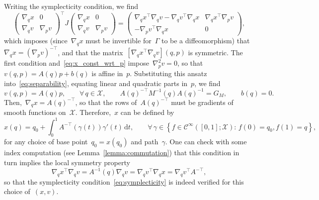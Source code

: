 \documentclass[10pt]{article}
\renewcommand{\d}{\mathrm{d}}
\newcommand{\cX}{\mathcal{X}}
\newcommand{\1}{\mathbbm 1}
\begin{document}
Writing the symplecticity condition, we find
\begin{equation}
    \begin{pmatrix}
        \nabla_q x & 0 \\ \nabla_q v & \nabla_p v
    \end{pmatrix}^\top J \begin{pmatrix}
        \nabla_q x & 0 \\ \nabla_q v & \nabla_p v
    \end{pmatrix} = \begin{pmatrix}
    \nabla_q x^\top\nabla_q v -\nabla_q v^\top \nabla_q x & \nabla_q x^\top \nabla_p v \\ -\nabla_p v^\top\nabla_q x & 0
    \end{pmatrix},
\end{equation}
which imposes (since~$\nabla_q x$ must be invertible for~$\Gamma$ to be a diffeomorphism) that~${\nabla_q x = \left(\nabla_p v\right)^{-\top}}$, and that the matrix~$\left[\nabla_q x^\top \nabla_q v\right](q,p)$ is symmetric.
The first condition and~\eqref{eq:x_const_wrt_p} impose~${\nabla^2_p v=0}$, so that~${v(q,p)=A(q) p+b(q)}$ is affine in~$p$. Substituting this ansatz into~\eqref{eq:separability}, equating linear and quadratic parts in~$p$, we find
\begin{equation}
    \label{eq:factorization}
   v(q,p)=A(q)p,\qquad\forall\,q\in \cX,\qquad A(q)^{-\top} M^{-1}(q)A(q)^{-1} = G_M,\qquad b(q)=0.
\end{equation}
Then,~$\nabla_q x = A(q)^{-\top}$, so that the rows of~$A(q)^{-\top}$ must be gradients of smooth functions on~$\cX$. Therefore,~$x$ can be defined by
\begin{equation}
    \label{eq:q_definition}
    x(q) = q_0 + \int_{0}^1 A^{-\top}(\gamma(t))\gamma'(t)\,\d t,\qquad\forall\,\gamma\in\left\{f\in\mathcal C^\infty([0,1];\cX):\, f(0)=q_0,f(1)=q\right\},
\end{equation}
for any choice of base point~$q_0=x(q_0)$ and path~$\gamma$. One can check with some index computation (see Lemma~\ref{lemma:commutation}) that this condition in turn implies the local symmetry property
\begin{equation}
    \label{eq:symmetry_condition}
\nabla_q x^\top \nabla_q v = A^{-1}(q)\nabla_q v = \nabla_q v^\top \nabla_q x = \nabla_q v^\top A^{-\top},
\end{equation}
so that the symplecticity condition~\eqref{eq:symplecticity} is indeed verified for this choice of~$(x,v)$.
\end{document}

